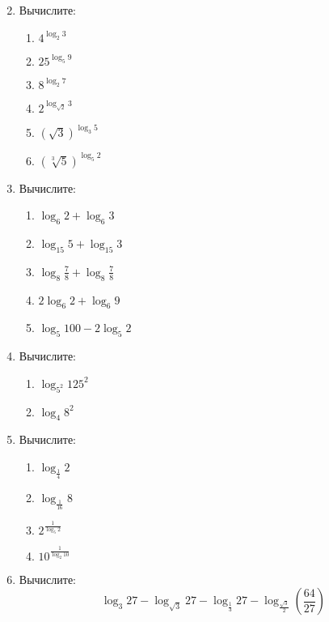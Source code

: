 \documentclass[12pt, a4paper]{article}
\begin{document}
\begin{enumerate}
\begin{multicols}{3}
	\end{multicols}
	\item Вычислите:
	\begin{multicols}{3}
		\begin{enumerate}[label=\asbuk*)]
			\item $4^{\log_2 3}$
			\item $25^{\log_5 9}$
			\item $8^{\log_2 7}$
			\item $2^{\log_{\sqrt{2}}3}$
			\item $(\sqrt{3})^{\log_3 5}$
			\item $(\sqrt[3]{5})^{\log_5 2}$
		\end{enumerate}
	\end{multicols}
	\item Вычислите:
	\begin{multicols}{3}
		\begin{enumerate}[label=\asbuk*)]
			\item $\log_6 2 + \log_6 3$
			\item $\log_{15} 5 + \log_{15} 3$
			\item $\log_8 \frac{7}{8} + \log_8 \frac{7}{8}$
			\item $2\log_6 2 + \log_6 9$
			\item $\log_5 100 - 2\log_5 2$
		\end{enumerate}
	\end{multicols}
	\item Вычислите:
	\begin{multicols}{2}
		\begin{enumerate}[label=\asbuk*)]
			\item $\log_{5^2}125^2$
			\item $\log_{4}8^2$
		\end{enumerate}
	\end{multicols}
	\item Вычислите:
	\begin{multicols}{4}
		\begin{enumerate}[label=\asbuk*)]
			\item $\log_{\frac{1}{4}}2$
			\item $\log_{\frac{1}{16}}8$
			\item $2^{\frac{1}{\log_5 2}}$
			\item $10^{\frac{1}{\log_2 10}}$
		\end{enumerate}
	\end{multicols}
	\item Вычислите: $$\log_3 27 - \log_{\sqrt{3}}27-\log_{\frac{1}{3}}27-\log_{\frac{\sqrt{3}}{2}}\left(\dfrac{64}{27}\right)$$

\end{enumerate}
\end{document}
